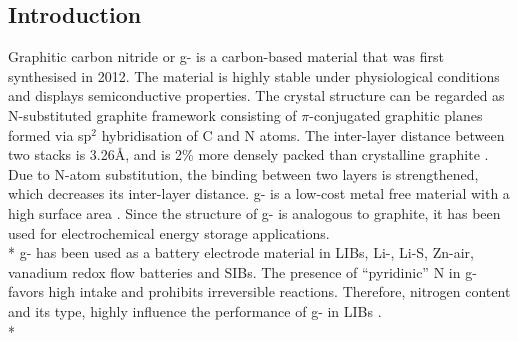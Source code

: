 \subsection{Introduction}
Graphitic carbon nitride or g- is a carbon-based material that was first synthesised in 2012. The material is highly stable under physiological conditions and displays semiconductive properties. The crystal structure can be regarded as N-substituted graphite framework consisting of $\pi$-conjugated graphitic planes formed via sp$^2$ hybridisation of C and N atoms. The inter-layer distance between two stacks is 3.26\AA, and is 2\% more densely packed than crystalline graphite \cite{zheng_graphitic_2012}. Due to N-atom substitution, the binding between two layers is strengthened, which decreases its inter-layer distance. g- is a low-cost metal free material with a high surface area \cite{zheng_graphitic_2012}. Since the structure of g- is analogous to graphite, it has been used for electrochemical energy storage applications. \\*
g- has been used as a battery electrode material in LIBs, Li-, Li-S, Zn-air, vanadium redox flow batteries and SIBs. The presence of \enquote{pyridinic} N in g- favors high  intake and prohibits irreversible reactions. Therefore, nitrogen content and its type, highly influence the performance of g- in LIBs \cite{shah_highly_2017}. \\*
